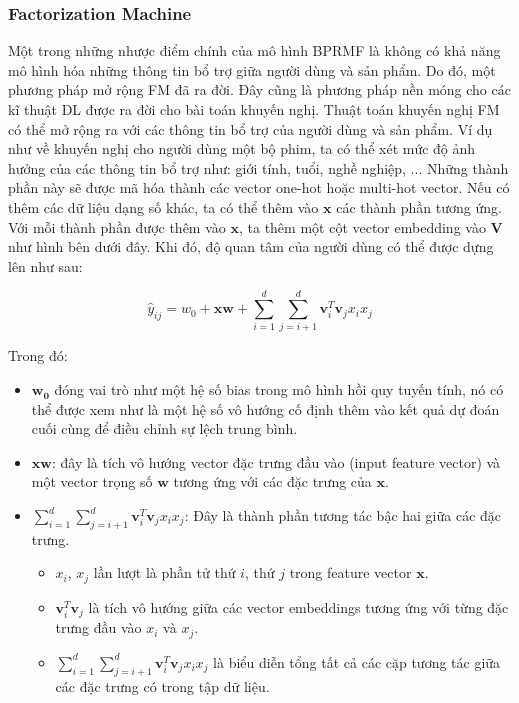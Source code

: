 \subsubsection{Factorization Machine}
Một trong những nhược điểm chính của mô hình BPRMF là không có khả năng mô hình hóa
những thông tin bổ trợ giữa người dùng và sản phẩm. Do đó, một phương pháp mở rộng FM đã ra đời.
Đây cũng là phương pháp nền móng cho các kĩ thuật DL được ra đời cho bài toán khuyến nghị.
\newline
\indent Thuật toán khuyến nghị FM có thể mở rộng ra với các thông tin bổ trợ của người dùng và sản phẩm.
Ví dụ như về khuyến nghị cho người dùng một bộ phim, ta có thể xét mức độ ảnh hưởng của
các thông tin bổ trợ như: giới tính, tuổi, nghề nghiệp, ... Những thành phần này sẽ được mã hóa
thành các vector one-hot hoặc multi-hot vector. Nếu có thêm các dữ liệu dạng số khác,
ta có thể thêm vào $\mathbf{x}$ các thành phần tương ứng. Với mỗi thành phần được thêm vào
$\mathbf{x}$, ta thêm một cột vector embedding vào $\mathbf{V}$ như hình bên dưới đây.
Khi đó, độ quan tâm của người dùng có thể được dựng lên như sau:

$$\hat{y}_{ij} = w_0 + \mathbf{xw} + \sum_{i=1}^{d}\sum_{j=i+1}^{d} \mathbf{v}_i^T\mathbf{v}_jx_ix_j$$

Trong đó:

\begin{itemize}
    \item $\mathbf{w_0}$ đóng vai trò như một hệ số bias trong mô hình hồi quy tuyến tính,
    nó có thể được xem như là một hệ số vô hướng cố định thêm vào kết quả dự đoán cuối cùng để điều chỉnh sự lệch trung bình.
    \item $\mathbf{xw}$: đây là tích vô hướng vector đặc trưng đầu vào (input feature vector)
    và một vector trọng số $\mathbf{w}$ tương ứng với các đặc trưng của $\mathbf{x}$.
    \item $\sum_{i=1}^{d}\sum_{j=i+1}^{d} \mathbf{v}_i^T\mathbf{v}_jx_ix_j$: Đây là thành phần tương tác bậc hai giữa các đặc trưng.
    \begin{itemize}
        \item $x_i$, $x_j$ lần lượt là phần tử thứ $i$, thứ $j$ trong feature vector $\mathbf{x}$.
        \item $\mathbf{v}_i^T\mathbf{v}_j$ là tích vô hướng giữa các vector embeddings tương ứng với từng đặc trưng đầu vào $x_i$ và $x_j$.
        \item $\sum_{i=1}^{d}\sum_{j=i+1}^{d} \mathbf{v}_i^T\mathbf{v}_jx_ix_j$ là biểu diễn tổng tất cả các cặp tương tác giữa các đặc trưng có trong tập dữ liệu.
    \end{itemize}
\end{itemize}

